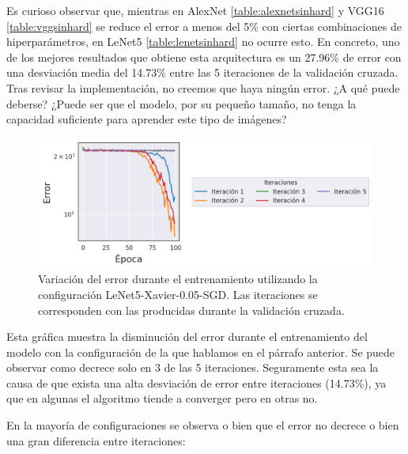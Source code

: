 Es curioso observar que, mientras en AlexNet \ref{table:alexnetsinhard} y VGG16 \ref{table:vggsinhard} se reduce el error a menos del 5\% con ciertas combinaciones de hiperparámetros, en LeNet5 \ref{table:lenetsinhard} no ocurre esto. En concreto, uno de los mejores resultados que obtiene esta arquitectura es un 27.96\% de error con una desviación media del 14.73\% entre las 5 iteraciones de la validación cruzada. Tras revisar la implementación, no creemos que haya ningún error. ¿A qué puede deberse? ¿Puede ser que el modelo, por su pequeño tamaño, no tenga la capacidad suficiente para aprender este tipo de imágenes?

\begin{figure}[H]
\centering
    \includegraphics[scale=0.65]{imagenes/image_classification/original_dataset/loss1.png}
    \caption{Variación del error durante el entrenamiento utilizando la configuración LeNet5-Xavier-0.05-SGD. Las iteraciones se corresponden con las producidas durante la validación cruzada.}
\end{figure}

Esta gráfica muestra la disminución del error durante el entrenamiento del modelo con la configuración de la que hablamos en el párrafo anterior. Se puede observar como decrece solo en 3 de las 5 iteraciones. Seguramente esta sea la causa de que exista una alta desviación de error entre iteraciones (14.73\%), ya que en algunas el algoritmo tiende a converger pero en otras no. %

En la mayoría de configuraciones se observa o bien que el error no decrece o bien una gran diferencia entre iteraciones:

